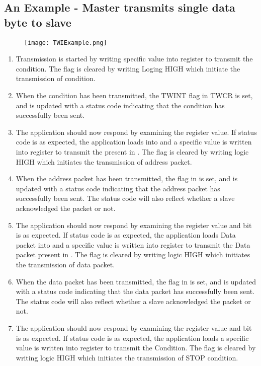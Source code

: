 \documentclass{article}
\begin{document}
\subsection{An Example - Master transmits single data byte to slave}
\begin{figure}[H]
    \centering
    \texttt{[image: TWIExample.png]}
\end{figure}
\begin{enumerate}
    \item Transmission is started by writing specific value into  register to transmit the  condition. The  flag is cleared by writing Loging HIGH which initiate the transmission of  condition.
    \item When the  condition has been transmitted, the TWINT flag in TWCR is set, and  is updated with a status code indicating that the  condition has successfully been sent.
    \item The application should now respond by examining the  register value. If status code is as expected, the application loads  into  and a specific value is written into  register to transmit the  present in . The  flag is cleared by writing logic HIGH which initiates the transmission of address packet.
    \item When the address packet has been transmitted, the  flag in  is set, and  is updated with a status code indicating that the address packet has successfully been sent. The status code will also reflect whether a slave acknowledged the packet or not.
    \item The application should now respond by examining the  register value and  bit is as expected. If status code is as expected, the application loads Data packet into  and a specific value is written into  register to transmit the Data packet present in . The  flag is cleared by writing logic HIGH which initiates the transmission of data packet.
    \item When the data packet has been transmitted, the  flag in  is set, and  is updated with a status code indicating that the data packet has successfully been sent. The status code will also reflect whether a slave acknowledged the packet or not.
    \item The application should now respond by examining the  register value and  bit is as expected. If status code is as expected, the application loads a specific value is written into  register to transmit the  Condition. The  flag is cleared by writing logic HIGH which initiates the transmission of STOP condition.
\end{enumerate}
\end{document}
